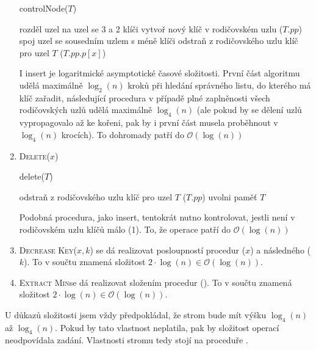 \documentclass[12pt]{iv003}
\begin{document}
\begin{enumerate}
	\begin{procedure}[H]
		\caption{controlNode($T$) }
		\Output{}
		 {
			rozděl uzel na uzel se 3 a 2 klíči \;
			vytvoř nový klíč v rodičovském uzlu \;
			\ffcontrolnode($T.pp$) 
		}
		 {
			spoj uzel se sousedním uzlem s méně klíči \;
			odstraň z rodičovského uzlu klíč pro uzel $T$ \;
			\ffcontrolnode($T.pp.p[x]$) 
		}
	\end{procedure}
	I insert je logaritmické asymptotické časové složitosti. První část algoritmu udělá maximálně $\log_{2}(n)$ kroků při hledání správného listu, do kterého má klíč zařadit, následující procedura \ffcontrolnode v případě plné zaplněnosti všech rodičovských uzlů udělá maximálně $\log_{4}(n)$ (ale pokud by se dělení uzlů vypropagovalo až ke kořeni, pak by i první část musela proběhnout v $\log_{4}(n)$ krocích). To dohromady patří do $\mathcal{O}(\log(n))$
	\item \textsc{Delete}($x$)
	
	\begin{procedure}[H]
		\caption{delete($T$) }
		\Output{}
		odstraň z rodičovského uzlu klíč pro uzel $T$ \;
		\ffcontrolNode($T.pp$) \;
		uvolni paměť $T$ \;
	\end{procedure}
	
	Podobná procedura, jako insert, tentokrát nutno kontrolovat, jestli není v rodičovském uzlu klíčů málo (1). To, že operace patří do $\mathcal{O}(\log(n))$
	\item \textsc{Decrease Key}($x,k$) se dá realizovat posloupností procedur \ffdelete($x$) a následného \ffinsert($k$). To v součtu znamená složitost $2\cdot \log(n) \in \mathcal{O}(\log(n))$.
	\item \textsc{Extract Min}se dá realizovat složením procedur \ffdelete(\ffminimum). To v součtu znamená složitost $2\cdot \log(n) \in \mathcal{O}(\log(n))$.
\end{enumerate}
U důkazů složitosti jsem vždy předpokládal, že strom bude mít výšku $\log_{4}(n)$ až $\log_{4}(n)$. Pokud by tato vlastnost neplatila, pak by složitost operací neodpovídala zadání. Vlastnosti stromu tedy stojí na proceduře \ffcontrolnode.
\end{document}
